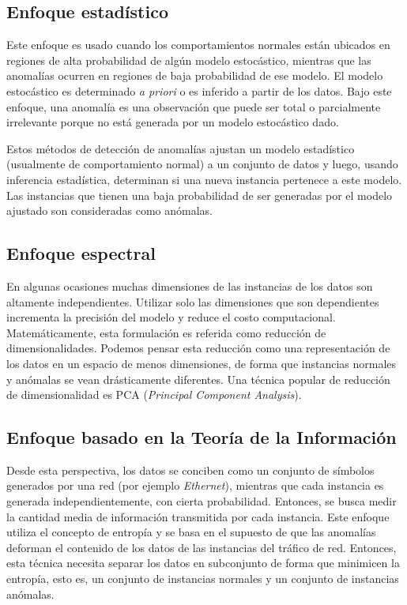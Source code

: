 \documentclass[a4paper,10pt, oneside]{article}
\begin{document}
\subsection{Enfoque estadístico}
Este enfoque es usado cuando los comportamientos normales están ubicados en regiones de alta probabilidad de algún modelo estocástico, mientras que las anomalías ocurren en regiones de baja probabilidad de ese modelo\cite{Chandola:2009:ADS:1541880.1541882}. El modelo estocástico es determinado \textit{a priori} o es inferido a partir de los datos. Bajo este enfoque, una anomalía es una observación que puede ser total o parcialmente irrelevante porque no está generada por un modelo estocástico dado\cite{Anscombe:1960:RO}. \par
Estos métodos de detección de anomalías ajustan un modelo estadístico (usualmente de comportamiento normal) a un conjunto de datos y luego, usando inferencia estadística, determinan si una nueva instancia pertenece a este modelo. Las instancias que tienen una baja probabilidad de ser generadas por el modelo ajustado son consideradas como anómalas.

\subsection{Enfoque espectral}
	En algunas ocasiones muchas dimensiones de las instancias de los datos son altamente independientes. Utilizar solo las dimensiones que son dependientes incrementa la precisión del modelo y reduce el costo computacional. Matemáticamente, esta formulación es referida como reducción de dimensionalidades\cite{wang2012geometric}. Podemos pensar esta reducción como una representación de los datos en un espacio de menos dimensiones, de forma que instancias normales y anómalas se vean drásticamente diferentes. Una técnica popular de reducción de dimensionalidad es PCA (\textit{Principal Component Analysis}).

\subsection{Enfoque basado en la Teoría de la Información}
Desde esta perspectiva, los datos se conciben como un conjunto de símbolos generados por una red (por ejemplo \textit{Ethernet}), mientras que cada instancia es generada independientemente, con cierta probabilidad. Entonces, se busca medir la cantidad media de información transmitida por cada instancia. Este enfoque utiliza el concepto de entropía y se basa en el supuesto de que las anomalías deforman el contenido de los datos de las instancias del tráfico de red\cite{baddar2014anomaly}. Entonces, esta técnica necesita separar los datos en subconjunto de forma que minimicen la entropía, esto es, un conjunto de instancias normales y un conjunto de instancias anómalas.
\end{document}
